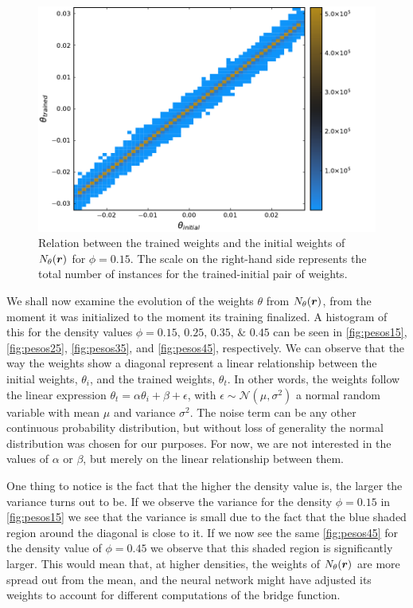 \begin{figure}[t]
    \includegraphics[width=\textwidth]{figuras/capitulo-4/weights_phi=0.15.pdf}
    \caption[Comparison between weights, $\phi=0.15$.]{Relation between the trained weights and the initial weights of $N_{\theta}(\bm{r})$ for $\phi=0.15$. The scale on the right-hand side represents the total number of instances for the trained-initial pair of weights.} 
    \label{fig:pesos15}
\end{figure}

We shall now examine the evolution of the weights $\theta$ from
$N_{\theta}(\bm{r})$, from the moment it was initialized to the moment its training finalized.
A histogram of this for the density values 
$\phi=\numlist[list-final-separator={\; \text{and} \;}]{0.15;0.25;0.35;0.45}$ 
can be seen in \autoref{fig:pesos15}, \autoref{fig:pesos25}, \autoref{fig:pesos35}, 
and \autoref{fig:pesos45}, respectively.
We can observe that the way the weights show a diagonal represent a linear relationship 
between the initial weights, $\theta_{i}$, and the trained weights, $\theta_{t}$. In other 
words, the weights follow the linear expression
$\theta_{t} = \alpha \theta_{i} + \beta + \epsilon$, with
$\epsilon \sim \mathcal{N}(\mu, \sigma^{2})$ a normal random variable with mean
$\mu$ and variance $\sigma^2$. The noise term can be any other continuous probability 
distribution, but without loss of generality the normal distribution was chosen for
our purposes. For now, we are not interested in the values of $\alpha$ or $\beta$,
but merely on the linear relationship between them.

One thing to notice is the fact that the higher the density value is, the larger
the variance turns out to be. If we observe the variance for the density
$\phi=0.15$ in \autoref{fig:pesos15}
we see that the variance is small due to the fact that the blue shaded region around
the diagonal is close to it. If we now see the same \autoref{fig:pesos45} for the 
density value of $\phi=0.45$ we observe that this shaded region is significantly larger.
This would mean that, at higher densities, the weights of $N_{\theta}(\bm{r})$ are more spread out
from the mean, and the neural network might have adjusted its weights to account for
different computations of the bridge function.


